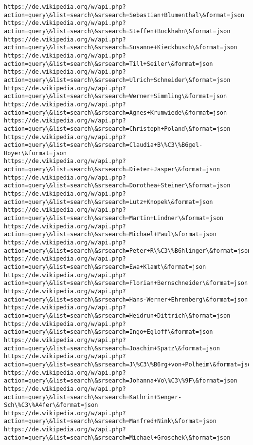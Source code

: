 \documentclass[11pt]{article}
\begin{document}
\begin{Verbatim}[commandchars=\\\{\}]
https://de.wikipedia.org/w/api.php?action=query\&list=search\&srsearch=Sebastian+Blumenthal\&format=json
https://de.wikipedia.org/w/api.php?action=query\&list=search\&srsearch=Steffen+Bockhahn\&format=json
https://de.wikipedia.org/w/api.php?action=query\&list=search\&srsearch=Susanne+Kieckbusch\&format=json
https://de.wikipedia.org/w/api.php?action=query\&list=search\&srsearch=Till+Seiler\&format=json
https://de.wikipedia.org/w/api.php?action=query\&list=search\&srsearch=Ulrich+Schneider\&format=json
https://de.wikipedia.org/w/api.php?action=query\&list=search\&srsearch=Werner+Simmling\&format=json
https://de.wikipedia.org/w/api.php?action=query\&list=search\&srsearch=Agnes+Krumwiede\&format=json
https://de.wikipedia.org/w/api.php?action=query\&list=search\&srsearch=Christoph+Poland\&format=json
https://de.wikipedia.org/w/api.php?action=query\&list=search\&srsearch=Claudia+B\%C3\%B6gel-Hoyer\&format=json
https://de.wikipedia.org/w/api.php?action=query\&list=search\&srsearch=Dieter+Jasper\&format=json
https://de.wikipedia.org/w/api.php?action=query\&list=search\&srsearch=Dorothea+Steiner\&format=json
https://de.wikipedia.org/w/api.php?action=query\&list=search\&srsearch=Lutz+Knopek\&format=json
https://de.wikipedia.org/w/api.php?action=query\&list=search\&srsearch=Martin+Lindner\&format=json
https://de.wikipedia.org/w/api.php?action=query\&list=search\&srsearch=Michael+Paul\&format=json
https://de.wikipedia.org/w/api.php?action=query\&list=search\&srsearch=Peter+R\%C3\%B6hlinger\&format=json
https://de.wikipedia.org/w/api.php?action=query\&list=search\&srsearch=Ewa+Klamt\&format=json
https://de.wikipedia.org/w/api.php?action=query\&list=search\&srsearch=Florian+Bernschneider\&format=json
https://de.wikipedia.org/w/api.php?action=query\&list=search\&srsearch=Hans-Werner+Ehrenberg\&format=json
https://de.wikipedia.org/w/api.php?action=query\&list=search\&srsearch=Heidrun+Dittrich\&format=json
https://de.wikipedia.org/w/api.php?action=query\&list=search\&srsearch=Ingo+Egloff\&format=json
https://de.wikipedia.org/w/api.php?action=query\&list=search\&srsearch=Joachim+Spatz\&format=json
https://de.wikipedia.org/w/api.php?action=query\&list=search\&srsearch=J\%C3\%B6rg+von+Polheim\&format=json
https://de.wikipedia.org/w/api.php?action=query\&list=search\&srsearch=Johanna+Vo\%C3\%9F\&format=json
https://de.wikipedia.org/w/api.php?action=query\&list=search\&srsearch=Kathrin+Senger-Sch\%C3\%A4fer\&format=json
https://de.wikipedia.org/w/api.php?action=query\&list=search\&srsearch=Manfred+Nink\&format=json
https://de.wikipedia.org/w/api.php?action=query\&list=search\&srsearch=Michael+Groschek\&format=json

\end{Verbatim}
\end{document}
